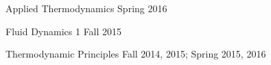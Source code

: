 \begin{outerlist}
\item Applied Thermodynamics \hfill Spring 2016

\item Fluid Dynamics 1 \hfill Fall 2015

\item Thermodynamic Principles \hfill Fall 2014, 2015; Spring 2015, 2016


\end{outerlist}
